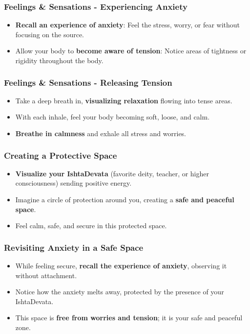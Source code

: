 \begin{frame}[fragile]\frametitle{Feelings \& Sensations - Experiencing Anxiety}
    \begin{itemize}
        \item \textbf{Recall an experience of anxiety}: Feel the stress, worry, or fear without focusing on the source.
        \item Allow your body to \textbf{become aware of tension}: Notice areas of tightness or rigidity throughout the body.
    \end{itemize}
\end{frame}

\begin{frame}[fragile]\frametitle{Feelings \& Sensations - Releasing Tension}
    \begin{itemize}
        \item Take a deep breath in, \textbf{visualizing relaxation} flowing into tense areas.
        \item With each inhale, feel your body becoming soft, loose, and calm.
        \item \textbf{Breathe in calmness} and exhale all stress and worries.
    \end{itemize}
\end{frame}

\begin{frame}[fragile]\frametitle{Creating a Protective Space}
    \begin{itemize}
        \item \textbf{Visualize your IshtaDevata} (favorite deity, teacher, or higher consciousness) sending positive energy.
        \item Imagine a circle of protection around you, creating a \textbf{safe and peaceful space}.
        \item Feel calm, safe, and secure in this protected space.
    \end{itemize}
\end{frame}

\begin{frame}[fragile]\frametitle{Revisiting Anxiety in a Safe Space}
    \begin{itemize}
        \item While feeling secure, \textbf{recall the experience of anxiety}, observing it without attachment.
        \item Notice how the anxiety melts away, protected by the presence of your IshtaDevata.
        \item This space is \textbf{free from worries and tension}; it is your safe and peaceful zone.
    \end{itemize}
\end{frame}

